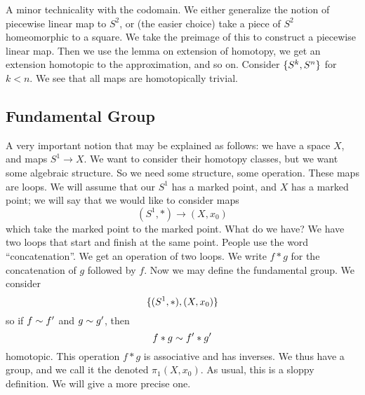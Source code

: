 A minor technicality with the codomain. We either generalize the
notion of piecewise linear map to $S^2$, or (the easier choice)
take a piece of $S^2$ homeomorphic to a square. We take the
preimage of this to construct a piecewise linear map. Then we use
the lemma on extension of homotopy, we get an extension homotopic
to the approximation, and so on. Consider
$\homotopyClass(S^k,S^n)$ for $k<n$. We see that all maps are
homotopically trivial.

\subsection{Fundamental Group}
A very important notion that may be explained as follows: we have
a space $X$, and maps $S^1\to X$. We want to consider their
homotopy classes, but we want some algebraic structure. So we
need some structure, some operation. These maps are loops. We
will assume that our $S^1$ has a marked point, and $X$ has a
marked point; we will say that we would like to consider maps
\begin{equation}
(S^1,*)\to(X,x_0)
\end{equation}
which take the marked point to the marked point. What do we have?
We have two loops that start and finish at the same point. People
use the word ``concatenation''. We
get an operation of two loops. %
We write $f*g$ for the concatenation of $g$ followed by
$f$.
Now we may define the fundamental
group. We
consider
\begin{equation}
\homotopyClass({(S^1,*)},{(X,x_0)})
\end{equation}
so if $f\sim f'$ and $g\sim g'$, then
\begin{equation}
f*g\sim f'*g'
\end{equation}
homotopic. This operation $f*g$ is associative and has
inverses. We thus have a group, and we call it the
 denoted $\pi_{1}(X,x_0)$.
As usual, this is a sloppy definition. We will give a more
precise one.

